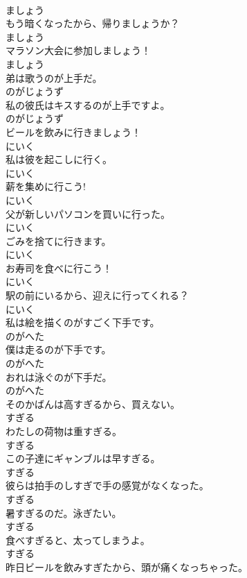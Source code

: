 \documentclass[8pt]{extreport}
\begin{document}
\begin{CJK}{UTF8}{min}
\\	ましょう
\\	もう暗くなったから、帰りましょうか？	
\\	ましょう
\\	マラソン大会に参加しましょう！	
\\	ましょう
\\	弟は歌うのが上手だ。	
\\	のがじょうず
\\	私の彼氏はキスするのが上手ですよ。	
\\	のがじょうず
\\	ビールを飲みに行きましょう！	
\\	にいく
\\	私は彼を起こしに行く。	
\\	にいく
\\	薪を集めに行こう!	
\\	にいく
\\	父が新しいパソコンを買いに行った。	
\\	にいく
\\	ごみを捨てに行きます。	
\\	にいく
\\	お寿司を食べに行こう！	
\\	にいく
\\	駅の前にいるから、迎えに行ってくれる？	
\\	にいく
\\	私は絵を描くのがすごく下手です。	
\\	のがへた
\\	僕は走るのが下手です。	
\\	のがへた
\\	おれは泳ぐのが下手だ。	
\\	のがへた
\\	そのかばんは高すぎるから、買えない。	
\\	すぎる
\\	わたしの荷物は重すぎる。	
\\	すぎる
\\	この子達にギャンブルは早すぎる。	
\\	すぎる
\\	彼らは拍手のしすぎで手の感覚がなくなった。	
\\	すぎる
\\	暑すぎるのだ。泳ぎたい。	
\\	すぎる
\\	食べすぎると、太ってしまうよ。	
\\	すぎる
\\	昨日ビールを飲みすぎたから、頭が痛くなっちゃった。	

\end{CJK}
\end{document}
